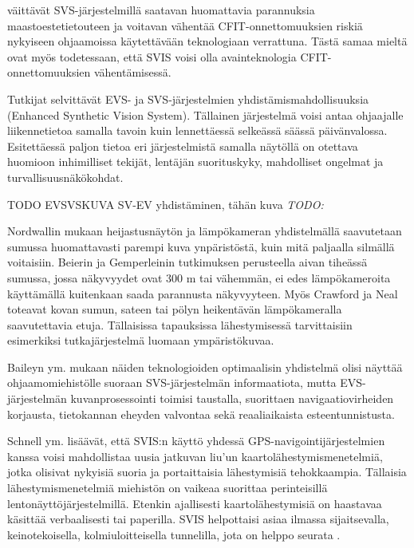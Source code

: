 \documentclass[utf8,bachelor,manualbib]{gradu3}
\begin{document}
\cite{baileyym2007} väittävät SVS-järjestelmillä saatavan huomattavia parannuksia maastoestetietouteen ja voitavan vähentää CFIT-onnettomuuksien riskiä nykyiseen ohjaamoissa käytettävään teknologiaan verrattuna. Tästä samaa mieltä ovat myös \cite{schnellym2004} todetessaan, että SVIS voisi olla avainteknologia CFIT-onnettomuuksien vähentämisessä.

Tutkijat selvittävät EVS- ja SVS-järjestelmien yhdistämismahdollisuuksia (Enhanced Synthetic Vision System). Tällainen järjestelmä voisi antaa ohjaajalle liikennetietoa samalla tavoin kuin lennettäessä selkeässä säässä päivänvalossa. Esitettäessä paljon tietoa eri järjestelmistä samalla näytöllä on otettava huomioon inhimilliset tekijät, lentäjän suorituskyky, mahdolliset ongelmat ja turvallisuusnäkökohdat. \citep{crawfordneal2006}

TODO EVSVSKUVA SV-EV yhdistäminen, tähän kuva \citep{mollersachs1994} \emph{TODO:}

Nordwallin \citeyearpar{nordwall1993} mukaan heijastusnäytön ja lämpökameran yhdistelmällä saavutetaan sumussa huomattavasti parempi kuva ynpäristöstä, kuin mitä paljaalla silmällä voitaisiin. Beierin ja Gemperleinin \citeyearpar{beiergemperlein2004} tutkimuksen perusteella aivan tiheässä sumussa, jossa näkyvyydet ovat 300 m tai vähemmän, ei edes lämpökameroita käyttämällä kuitenkaan saada parannusta näkyvyyteen. Myös Crawford ja Neal \citeyearpar{crawfordneal2006} toteavat kovan sumun, sateen tai pölyn heikentävän lämpökameralla saavutettavia etuja. Tällaisissa tapauksissa lähestymisessä tarvittaisiin esimerkiksi tutkajärjestelmä luomaan ympäristökuvaa.

Baileyn ym.\citeyearpar{baileyym2007} mukaan näiden teknologioiden optimaalisin yhdistelmä olisi näyttää ohjaamomiehistölle suoraan SVS-järjestelmän informaatiota, mutta EVS-järjestelmän kuvanprosessointi toimisi taustalla, suorittaen navigaatiovirheiden korjausta, tietokannan eheyden valvontaa sekä reaaliaikaista esteentunnistusta.

Schnell ym. \citeyearpar{schnellym2004} lisäävät, että SVIS:n käyttö yhdessä GPS-navigointijärjestelmien kanssa voisi mahdollistaa uusia jatkuvan liu'un kaartolähestymismenetelmiä, jotka olisivat nykyisiä suoria ja portaittaisia lähestymisiä tehokkaampia. Tällaisia lähestymismenetelmiä miehistön on vaikeaa suorittaa perinteisillä lentonäyttöjärjestelmillä. Etenkin ajallisesti kaartolähestymisiä on haastavaa käsittää verbaalisesti tai paperilla. SVIS helpottaisi asiaa ilmassa sijaitsevalla, keinotekoisella, kolmiuloitteisella tunnelilla, jota on helppo seurata \citep{barrowspowell1999}.
\end{document}
